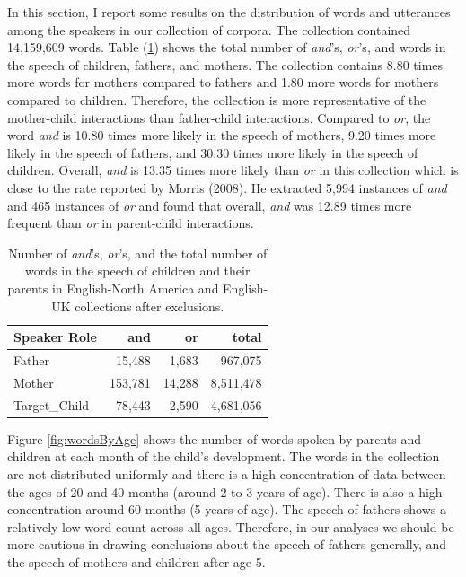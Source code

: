 \documentclass[floatsintext,man]{apa6}
\theoremstyle{definition}
\theoremstyle{definition}
\theoremstyle{definition}
\theoremstyle{remark}
\begin{document}
In this section, I report some results on the distribution of words and
utterances among the speakers in our collection of corpora. The
collection contained 14,159,609 words. Table (\ref{tab:countTable})
shows the total number of \emph{and}'s, \emph{or}'s, and words in the
speech of children, fathers, and mothers. The collection contains 8.80
times more words for mothers compared to fathers and 1.80 more words for
mothers compared to children. Therefore, the collection is more
representative of the mother-child interactions than father-child
interactions. Compared to \emph{or}, the word \emph{and} is 10.80 times
more likely in the speech of mothers, 9.20 times more likely in the
speech of fathers, and 30.30 times more likely in the speech of
children. Overall, \emph{and} is 13.35 times more likely than \emph{or}
in this collection which is close to the rate reported by Morris (2008).
He extracted 5,994 instances of \emph{and} and 465 instances of
\emph{or} and found that overall, \emph{and} was 12.89 times more
frequent than \emph{or} in parent-child interactions.

\begin{table}

\caption{\label{tab:countTable}Number of \textit{and}'s, \textit{or}'s, and the total number of words in the speech of children and their parents in English-North America and English-UK collections after exclusions.}
\centering
\begin{tabular}[t]{l|r|r|r}
\hline
Speaker Role & and & or & total\\
\hline
Father & 15,488 & 1,683 & 967,075\\
\hline
Mother & 153,781 & 14,288 & 8,511,478\\
\hline
Target\_Child & 78,443 & 2,590 & 4,681,056\\
\hline
\end{tabular}
\end{table}

Figure \ref{fig:wordsByAge} shows the number of words spoken by parents
and children at each month of the child's development. The words in the
collection are not distributed uniformly and there is a high
concentration of data between the ages of 20 and 40 months (around 2 to
3 years of age). There is also a high concentration around 60 months (5
years of age). The speech of fathers shows a relatively low word-count
across all ages. Therefore, in our analyses we should be more cautious
in drawing conclusions about the speech of fathers generally, and the
speech of mothers and children after age 5.
\end{document}
